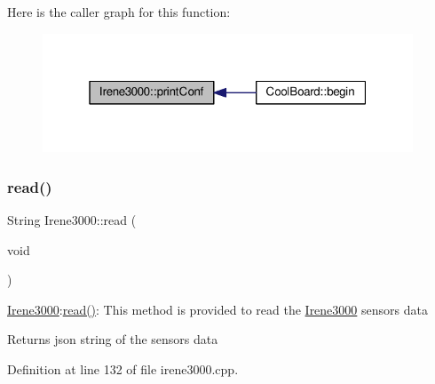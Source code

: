 Here is the caller graph for this function\+:\nopagebreak
\begin{figure}[H]
\begin{center}
\leavevmode
\includegraphics[width=313pt]{d6/d03/class_irene3000_a7bc2414100b5e19eacc6630fa34b2654_icgraph}
\end{center}
\end{figure}
\mbox{\label{class_irene3000_a852a170feea994ea1df01c6b245b5d9a}} 
\subsubsection{\texorpdfstring{read()}{read()}}
{\footnotesize\ttfamily String Irene3000\+::read (\begin{DoxyParamCaption}\item[{void}]{ }\end{DoxyParamCaption})}

\hyperlink{class_irene3000}{Irene3000}\+:\hyperlink{class_irene3000_a852a170feea994ea1df01c6b245b5d9a}{read()}\+: This method is provided to read the \hyperlink{class_irene3000}{Irene3000} sensors data

\begin{DoxyReturn}{Returns}
json string of the sensors data 
\end{DoxyReturn}


Definition at line 132 of file irene3000.\+cpp.



